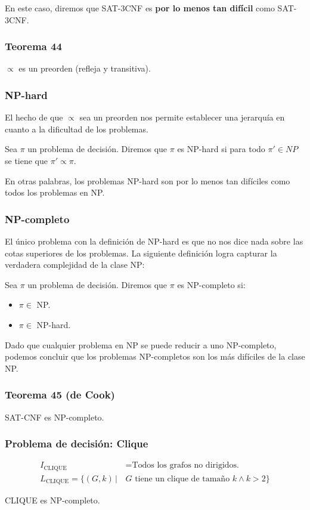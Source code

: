 \begin{multicols}{2}
    En este caso, diremos que SAT-3CNF es \textbf{por lo menos tan difícil} como SAT-3CNF.
    
    \subsubsection*{Teorema 44}
    $\propto$ es un preorden (refleja y transitiva).
    
    \subsubsection*{NP-hard}
    El hecho de que $\propto$ sea un preorden nos permite establecer una jerarquía en cuanto a la dificultad de los problemas. \p
    
    Sea $\pi$ un problema de decisión. Diremos que $\pi$ es NP-hard si para todo $\pi' \in NP$ se tiene que $\pi' \propto \pi$. \p
    
    En otras palabras, los problemas NP-hard son por lo menos tan difíciles como todos los problemas en NP.
    
    \subsubsection*{NP-completo}
    El único problema con la definición de NP-hard es que no nos dice nada sobre las cotas superiores de los problemas. La siguiente definición logra capturar la verdadera complejidad de la clase NP: \p
    
    Sea $\pi$ un problema de decisión. Diremos que $\pi$ es NP-completo si:
    \begin{itemize}
        \item $\pi \in$ NP.
        \item $\pi \in$ NP-hard.
    \end{itemize}
    Dado que cualquier problema en NP se puede reducir a uno NP-completo, podemos concluir que los problemas NP-completos son los más difíciles de la clase NP.
    
    \subsubsection*{Teorema 45 (de Cook)}
    SAT-CNF es NP-completo.
    
    \subsubsection*{Problema de decisión: Clique}
    \begin{align*}
        I_{\text{CLIQUE}} &= \text{Todos los grafos no dirigidos.} \\
        L_{\text{CLIQUE}} = \{ (G, k) \,|\, &G \text{ tiene un clique de tamaño } k \wedge k > 2 \}
    \end{align*}
    
    CLIQUE es NP-completo.
    
    
    \end{multicols}

